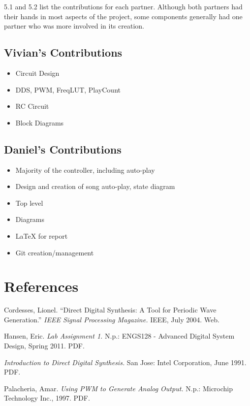 \documentclass{article}
\begin{document}
  5.1 and 5.2 list the contributions for each partner. Although both partners had their hands in most aspects of the project, some components generally had one partner who was more involved in its creation.

  \subsection{Vivian's Contributions}
    \begin{itemize}
      \item Circuit Design
      \item DDS, PWM, FreqLUT, PlayCount
      \item RC Circuit
      \item Block Diagrams
    \end{itemize}

  \subsection{Daniel's Contributions}
    \begin{itemize}
      \item Majority of the controller, including auto-play
      \item Design and creation of song auto-play, state diagram
      \item Top level
      \item Diagrams
      \item LaTeX for report
      \item Git creation/management
    \end{itemize}

\newpage
\section{References}


  \begin{thebibliography}{9}

  	Cordesses, Lionel.
  	``Direct Digital Synthesis: A Tool for Periodic Wave Generation.''
  	\emph{IEEE Signal Processing Magazine.}
  	IEEE,
  	July 2004. 
  	Web.  	

  	Hansen, Eric.
  	\emph{Lab Assignment 1.}
  	N.p.:
  	ENGS128 - Advanced Digital System Design, Spring 2011.
  	PDF.

  	\emph{Introduction to Direct Digital Synthesis.}
  	San Jose: Intel Corporation,
  	June 1991.
  	PDF.

  	Palacheria, Amar.
  	\emph{Using PWM to Generate Analog Output.}
  	N.p.: Microchip Technology Inc.,
  	1997.
  	PDF.

  \end{thebibliography}
\end{document}
